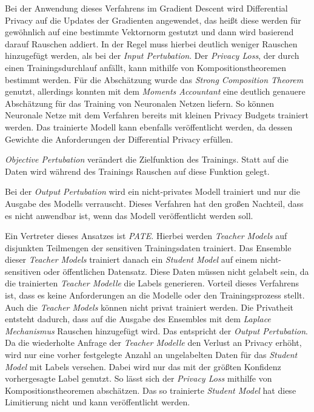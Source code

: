 Bei der Anwendung dieses Verfahrens im Gradient Descent wird Differential Privacy auf die Updates der Gradienten angewendet, das heißt diese werden für gewöhnlich auf eine bestimmte Vektornorm gestutzt und dann wird basierend darauf Rauschen addiert. In der Regel muss hierbei deutlich weniger Rauschen hinzugefügt werden, als bei der \textit{Input Pertubation}.\cite{chang:2023} Der \textit{Privacy Loss}, der durch einen Trainingsdurchlauf anfällt, kann mithilfe von Kompositionstheoremen bestimmt werden. Für die Abschätzung wurde das \textit{Strong Composition Theorem}\cite{dwork:2010} genutzt, allerdings konnten \textcite{abadi:2016} mit dem \textit{Moments Accountant} eine deutlich genauere Abschätzung für das Training von Neuronalen Netzen liefern. So können Neuronale Netze mit dem Verfahren bereits mit kleinen Privacy Budgets trainiert werden. Das trainierte Modell kann ebenfalls veröffentlicht werden, da dessen Gewichte die Anforderungen der Differential Privacy erfüllen.

\textit{Objective Pertubation} verändert die Zielfunktion des Trainings. Statt auf die Daten wird während des Trainings Rauschen auf diese Funktion gelegt.

Bei der \textit{Output Pertubation} wird ein nicht-privates Modell trainiert und nur die Ausgabe des Modells verrauscht. Dieses Verfahren hat den großen Nachteil, dass es nicht anwendbar ist, wenn das Modell veröffentlicht werden soll.

Ein Vertreter dieses Ansatzes ist \textit{PATE}\cite{papernot:2017}. Hierbei werden \textit{Teacher Models} auf disjunkten Teilmengen der sensitiven Trainingsdaten trainiert. Das Ensemble dieser \textit{Teacher Models} trainiert danach ein \textit{Student Model} auf einem nicht-sensitiven oder öffentlichen Datensatz. Diese Daten müssen nicht gelabelt sein, da die trainierten \textit{Teacher Modelle} die Labels generieren. Vorteil dieses Verfahrens ist, dass es keine Anforderungen an die Modelle oder den Trainingsprozess stellt. Auch die \textit{Teacher Models} können nicht privat trainiert werden. Die Privatheit entsteht dadurch, dass auf die Ausgabe des Ensembles mit dem \textit{Laplace Mechanismus} Rauschen hinzugefügt wird. Das entspricht der \textit{Output Pertubation}. Da die wiederholte Anfrage der \textit{Teacher Modelle} den Verlust an Privacy erhöht, wird nur eine vorher festgelegte Anzahl an ungelabelten Daten für das \textit{Student Model} mit Labels versehen. Dabei wird nur das mit der größten Konfidenz vorhergesagte Label genutzt. So lässt sich der \textit{Privacy Loss} mithilfe von Kompositionstheoremen abschätzen. Das so trainierte \textit{Student Model} hat diese Limitierung nicht und kann veröffentlicht werden.

